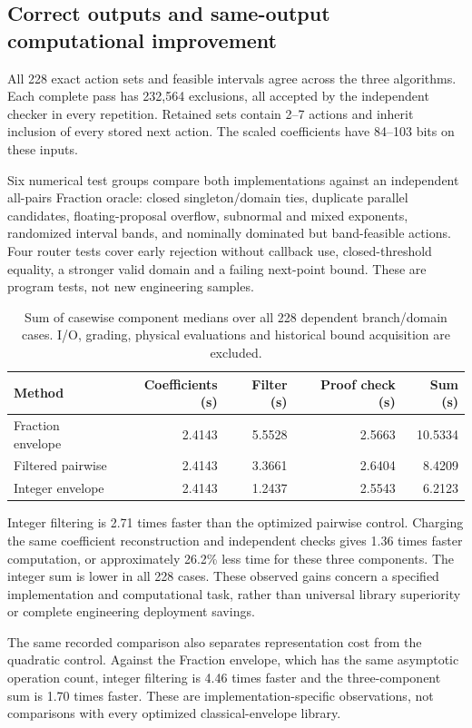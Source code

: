 \documentclass[]{interact}
\begin{document}
\subsection{Correct outputs and same-output computational improvement}

All 228 exact action sets and feasible intervals agree across the three algorithms. Each complete pass has 232,564 exclusions, all accepted by the independent checker in every repetition. Retained sets contain 2--7 actions and inherit inclusion of every stored next action. The scaled coefficients have 84--103 bits on these inputs.

Six numerical test groups compare both implementations against an independent all-pairs Fraction oracle: closed singleton/domain ties, duplicate parallel candidates, floating-proposal overflow, subnormal and mixed exponents, randomized interval bands, and nominally dominated but band-feasible actions. Four router tests cover early rejection without callback use, closed-threshold equality, a stronger valid domain and a failing next-point bound. These are program tests, not new engineering samples.

\begin{table}[htbp]\centering\small
\caption{Sum of casewise component medians over all 228 dependent branch/domain cases. I/O, grading, physical evaluations and historical bound acquisition are excluded.}\label{tab:strong_comparison}
\begin{tabular}{lrrrr}\toprule
Method & Coefficients (s) & Filter (s) & Proof check (s) & Sum (s)\\\midrule
Fraction envelope & 2.4143 & 5.5528 & 2.5663 & 10.5334 \\
Filtered pairwise & 2.4143 & 3.3661 & 2.6404 & 8.4209 \\
Integer envelope & 2.4143 & 1.2437 & 2.5543 & 6.2123 \\
\bottomrule\end{tabular}\end{table}

Integer filtering is 2.71 times faster than the optimized pairwise control. Charging the same coefficient reconstruction and independent checks gives 1.36 times faster computation, or approximately 26.2\% less time for these three components. The integer sum is lower in all 228 cases. These observed gains concern a specified implementation and computational task, rather than universal library superiority or complete engineering deployment savings.

The same recorded comparison also separates representation cost from the quadratic control. Against the Fraction envelope, which has the same asymptotic operation count, integer filtering is 4.46 times faster and the three-component sum is 1.70 times faster. These are implementation-specific observations, not comparisons with every optimized classical-envelope library.
\end{document}
